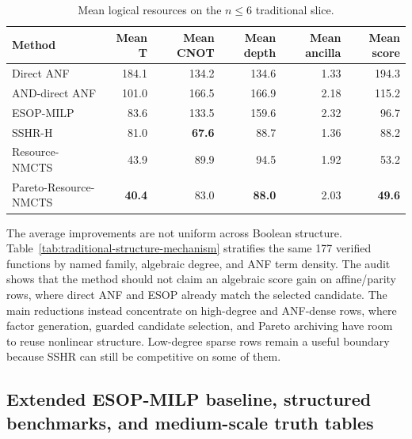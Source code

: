 \documentclass[11pt]{article}
\newcommand{\method}{Resource-NMCTS}
\begin{document}
\begin{table}[H]
\centering
\small
\caption{Mean logical resources on the $n\leq6$ traditional slice.}
\label{tab:traditional}
\begin{tabular}{lrrrrr}
\toprule
Method & Mean T & Mean CNOT & Mean depth & Mean ancilla & Mean score \\
\midrule
Direct ANF & 184.1 & 134.2 & 134.6 & 1.33 & 194.3 \\
AND-direct ANF & 101.0 & 166.5 & 166.9 & 2.18 & 115.2 \\
ESOP-MILP & 83.6 & 133.5 & 159.6 & 2.32 & 96.7 \\
SSHR-H & 81.0 & \textbf{67.6} & 88.7 & 1.36 & 88.2 \\
\method{} & 43.9 & 89.9 & 94.5 & 1.92 & 53.2 \\
Pareto-\method{} & \textbf{40.4} & 83.0 & \textbf{88.0} & 2.03 & \textbf{49.6} \\
\bottomrule
\end{tabular}
\end{table}

The average improvements are not uniform across Boolean structure.
Table~\ref{tab:traditional-structure-mechanism} stratifies the same 177
verified functions by named family, algebraic degree, and ANF term density.
The audit shows that the method should not claim an algebraic score gain on
affine/parity rows, where direct ANF and ESOP already match the selected
candidate.  The main reductions instead concentrate on high-degree and
ANF-dense rows, where factor generation, guarded candidate selection, and
Pareto archiving have room to reuse nonlinear structure.  Low-degree sparse
rows remain a useful boundary because SSHR can still be competitive on some of
them.

\begin{table}[H]
\centering
\scriptsize
\setlength{\tabcolsep}{2pt}
\renewcommand{\arraystretch}{1.04}
\caption{Traditional-slice structure mechanism audit.  Rows report paired score
win/loss/tie counts and mean relative score changes for Pareto-\method{} within
structural buckets of the same verified $n\leq6$ functions.}
\label{tab:traditional-structure-mechanism}

\end{table}

\subsection{Extended ESOP-MILP baseline, structured benchmarks, and medium-scale truth tables}
\label{sec:extended-results}
\end{document}
